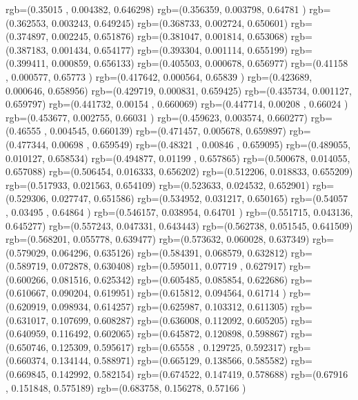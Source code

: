{{{      rgb=(0.35015 ,  0.004382,  0.646298)
      rgb=(0.356359,  0.003798,  0.64781 )
      rgb=(0.362553,  0.003243,  0.649245)
      rgb=(0.368733,  0.002724,  0.650601)
      rgb=(0.374897,  0.002245,  0.651876)
      rgb=(0.381047,  0.001814,  0.653068)
      rgb=(0.387183,  0.001434,  0.654177)
      rgb=(0.393304,  0.001114,  0.655199)
      rgb=(0.399411,  0.000859,  0.656133)
      rgb=(0.405503,  0.000678,  0.656977)
      rgb=(0.41158 ,  0.000577,  0.65773 )
      rgb=(0.417642,  0.000564,  0.65839 )
      rgb=(0.423689,  0.000646,  0.658956)
      rgb=(0.429719,  0.000831,  0.659425)
      rgb=(0.435734,  0.001127,  0.659797)
      rgb=(0.441732,  0.00154 ,  0.660069)
      rgb=(0.447714,  0.00208 ,  0.66024 )
      rgb=(0.453677,  0.002755,  0.66031 )
      rgb=(0.459623,  0.003574,  0.660277)
      rgb=(0.46555 ,  0.004545,  0.660139)
      rgb=(0.471457,  0.005678,  0.659897)
      rgb=(0.477344,  0.00698 ,  0.659549)
      rgb=(0.48321 ,  0.00846 ,  0.659095)
      rgb=(0.489055,  0.010127,  0.658534)
      rgb=(0.494877,  0.01199 ,  0.657865)
      rgb=(0.500678,  0.014055,  0.657088)
      rgb=(0.506454,  0.016333,  0.656202)
      rgb=(0.512206,  0.018833,  0.655209)
      rgb=(0.517933,  0.021563,  0.654109)
      rgb=(0.523633,  0.024532,  0.652901)
      rgb=(0.529306,  0.027747,  0.651586)
      rgb=(0.534952,  0.031217,  0.650165)
      rgb=(0.54057 ,  0.03495 ,  0.64864 )
      rgb=(0.546157,  0.038954,  0.64701 )
      rgb=(0.551715,  0.043136,  0.645277)
      rgb=(0.557243,  0.047331,  0.643443)
      rgb=(0.562738,  0.051545,  0.641509)
      rgb=(0.568201,  0.055778,  0.639477)
      rgb=(0.573632,  0.060028,  0.637349)
      rgb=(0.579029,  0.064296,  0.635126)
      rgb=(0.584391,  0.068579,  0.632812)
      rgb=(0.589719,  0.072878,  0.630408)
      rgb=(0.595011,  0.07719 ,  0.627917)
      rgb=(0.600266,  0.081516,  0.625342)
      rgb=(0.605485,  0.085854,  0.622686)
      rgb=(0.610667,  0.090204,  0.619951)
      rgb=(0.615812,  0.094564,  0.61714 )
      rgb=(0.620919,  0.098934,  0.614257)
      rgb=(0.625987,  0.103312,  0.611305)
      rgb=(0.631017,  0.107699,  0.608287)
      rgb=(0.636008,  0.112092,  0.605205)
      rgb=(0.640959,  0.116492,  0.602065)
      rgb=(0.645872,  0.120898,  0.598867)
      rgb=(0.650746,  0.125309,  0.595617)
      rgb=(0.65558 ,  0.129725,  0.592317)
      rgb=(0.660374,  0.134144,  0.588971)
      rgb=(0.665129,  0.138566,  0.585582)
      rgb=(0.669845,  0.142992,  0.582154)
      rgb=(0.674522,  0.147419,  0.578688)
      rgb=(0.67916 ,  0.151848,  0.575189)
      rgb=(0.683758,  0.156278,  0.57166 )
}}}
